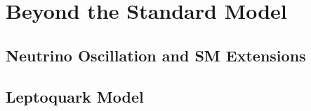 \chapter{Beyond the Standard Model}
\label{chap:BSM}

\section{Neutrino Oscillation and SM Extensions}

\section{Leptoquark Model}